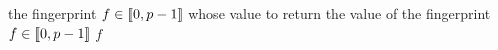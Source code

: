 \begin{algorithmic}[1]
  \In the fingerprint \( f \in \llbracket0, p - 1\rrbracket \) whose value to return
  \Out the value of the fingerprint \( f \in \llbracket0, p - 1\rrbracket \)
    \State \Return \( f \)
  \EndFunction
\end{algorithmic}
